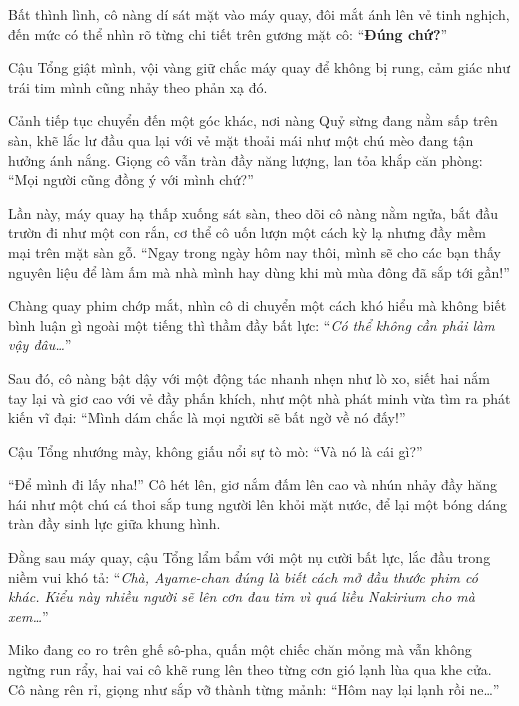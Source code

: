 \documentclass[../main.tex]{subfiles}
\begin{document}
Bất thình lình, cô nàng dí sát mặt vào máy quay, đôi mắt ánh lên vẻ tinh nghịch, đến mức có thể nhìn rõ từng chi tiết trên gương mặt cô: ``\textbf{Đúng chứ?}''

Cậu Tổng giật mình, vội vàng giữ chắc máy quay để không bị rung, cảm giác như trái tim mình cũng nhảy theo phản xạ đó.

Cảnh tiếp tục chuyển đến một góc khác, nơi nàng Quỷ sừng đang nằm sấp trên sàn, khẽ lắc lư đầu qua lại với vẻ mặt thoải mái như một chú mèo đang tận hưởng ánh nắng. Giọng cô vẫn tràn đầy năng lượng, lan tỏa khắp căn phòng: ``Mọi người cũng đồng ý với mình chứ?''


Lần này, máy quay hạ thấp xuống sát sàn, theo dõi cô nàng nằm ngửa, bắt đầu trườn đi như một con rắn, cơ thể cô uốn lượn một cách kỳ lạ nhưng đầy mềm mại trên mặt sàn gỗ. ``Ngay trong ngày hôm nay thôi, mình sẽ cho các bạn thấy nguyên liệu để làm ấm mà nhà mình hay dùng khi mù mùa đông đã sắp tới gần!''


Chàng quay phim chớp mắt, nhìn cô di chuyển một cách khó hiểu mà không biết bình luận gì ngoài một tiếng thì thầm đầy bất lực: ``\textit{Có thể không cần phải làm vậy đâu\dots}''

Sau đó, cô nàng bật dậy với một động tác nhanh nhẹn như lò xo, siết hai nắm tay lại và giơ cao với vẻ đầy phấn khích, như một nhà phát minh vừa tìm ra phát kiến vĩ đại: ``Mình dám chắc là mọi người sẽ bất ngờ về nó đấy!''


Cậu Tổng nhướng mày, không giấu nổi sự tò mò: ``Và nó là cái gì?''

``Để mình đi lấy nha!'' Cô hét lên, giơ nắm đấm lên cao và nhún nhảy đầy hăng hái như một chú cá thoi sắp tung người lên khỏi mặt nước, để lại một bóng dáng tràn đầy sinh lực giữa khung hình.

Đằng sau máy quay, cậu Tổng lẩm bẩm với một nụ cười bất lực, lắc đầu trong niềm vui khó tả: ``\textit{Chà, Ayame-chan đúng là biết cách mở đầu thước phim có khác. Kiểu này nhiều người sẽ lên cơn đau tim vì quá liều Nakirium cho mà xem\dots}''

\ct

Miko đang co ro trên ghế sô-pha, quấn một chiếc chăn mỏng mà vẫn không ngừng run rẩy, hai vai cô khẽ rung lên theo từng cơn gió lạnh lùa qua khe cửa. Cô nàng rên rỉ, giọng như sắp vỡ thành từng mảnh: ``Hôm nay lại lạnh rồi ne\dots''
\end{document}
